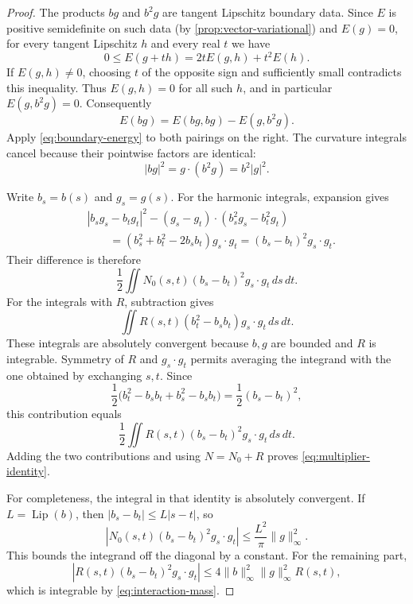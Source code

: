 \begin{proof}
The products $bg$ and $b^2g$ are tangent Lipschitz boundary data.
Since $E$ is positive semidefinite on such data (by
\cref{prop:vector-variational}) and $E(g)=0$, for every
tangent Lipschitz $h$ and every real $t$ we have
\[
 0\le E(g+th)=2tE(g,h)+t^2E(h).
\]
If $E(g,h)\ne0$, choosing $t$ of the opposite sign and sufficiently
small contradicts this inequality. Thus $E(g,h)=0$ for all such
$h$, and in particular $E(g,b^2g)=0$. Consequently
\[
 E(bg)=E(bg,bg)-E(g,b^2g).
\]
Apply \cref{eq:boundary-energy} to both pairings on the right.
The curvature integrals cancel because their pointwise factors
are identical:
\[
 |bg|^2=g\cdot(b^2g)=b^2|g|^2.
\]

Write $b_s=b(s)$ and $g_s=g(s)$. For the harmonic integrals,
expansion gives
\[
 \begin{aligned}
 &|b_sg_s-b_tg_t|^2
    -(g_s-g_t)\cdot(b_s^2g_s-b_t^2g_t)\\
 &\qquad=(b_s^2+b_t^2-2b_sb_t)g_s\cdot g_t
          =(b_s-b_t)^2g_s\cdot g_t.
 \end{aligned}
\]
Their difference is therefore
\[
 \frac12\iint N_0(s,t)(b_s-b_t)^2g_s\cdot g_t\,ds\,dt.
\]
For the integrals with $R$, subtraction gives
\[
 \iint R(s,t)(b_t^2-b_sb_t)g_s\cdot g_t\,ds\,dt.
\]
These integrals are absolutely convergent because $b,g$ are bounded
and $R$ is integrable. Symmetry of $R$ and $g_s\cdot g_t$ permits
averaging the integrand with the one obtained by exchanging $s,t$.
Since
\[
 \frac12\bigl(b_t^2-b_sb_t+b_s^2-b_sb_t\bigr)
 =\frac12(b_s-b_t)^2,
\]
this contribution equals
\[
 \frac12\iint R(s,t)(b_s-b_t)^2g_s\cdot g_t\,ds\,dt.
\]
Adding the two contributions and using $N=N_0+R$ proves
\cref{eq:multiplier-identity}.

For completeness, the integral in that identity is absolutely
convergent. If $L=\operatorname{Lip}(b)$, then
$|b_s-b_t|\le L|s-t|$, so
\[
 \left|N_0(s,t)(b_s-b_t)^2g_s\cdot g_t\right|
 \le\frac{L^2}{\pi}\|g\|_\infty^2.
\]
This bounds the integrand off the diagonal by a constant.
For the remaining part,
\[
 \left|R(s,t)(b_s-b_t)^2g_s\cdot g_t\right|
 \le4\|b\|_\infty^2\|g\|_\infty^2R(s,t),
\]
which is integrable by \cref{eq:interaction-mass}.
\end{proof}

